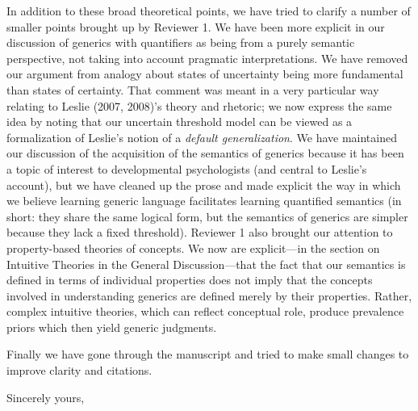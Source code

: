 \documentclass[11pt,letterpaper]{letter} %
\newcommand{\ndg}[1]{{\color{green}{[ndg: #1]}}}
\newcommand{\mht}[1]{{\color{blue}{[mht: #1]}}}
\begin{document}
\begin{letter}
In addition to these broad theoretical points, we have tried to clarify a number of smaller points brought up by Reviewer 1.
We have been more explicit in our discussion of generics with quantifiers as being from a purely semantic perspective, not taking into account pragmatic interpretations.
We have removed our argument from analogy about states of uncertainty being more fundamental than states of certainty.
That comment was meant in a very particular way relating to Leslie (2007, 2008)'s theory and rhetoric; we now express the same idea by noting that our uncertain threshold model can be viewed as a formalization of Leslie's notion of a \emph{default generalization}. 
We have maintained our discussion of the acquisition of the semantics of generics because it has been a topic of interest to developmental psychologists (and central to Leslie's account), but we have cleaned up the prose and made explicit the way in which we believe learning generic language facilitates learning quantified semantics (in short: they share the same logical form, but the semantics of generics are simpler because they lack a fixed threshold).
Reviewer 1 also brought our attention to property-based theories of concepts. We now are explicit---in the section on Intuitive Theories in the General Discussion---that the fact that our semantics is defined in terms of individual properties does not imply that the concepts involved in understanding generics are defined merely by their properties. Rather, complex intuitive theories, which can reflect conceptual role, produce prevalence priors which then yield generic judgments.

Finally we have gone through the manuscript and tried to make small changes to improve clarity and citations.



\closing{Sincerely yours,}

\end{letter}
\end{document}
